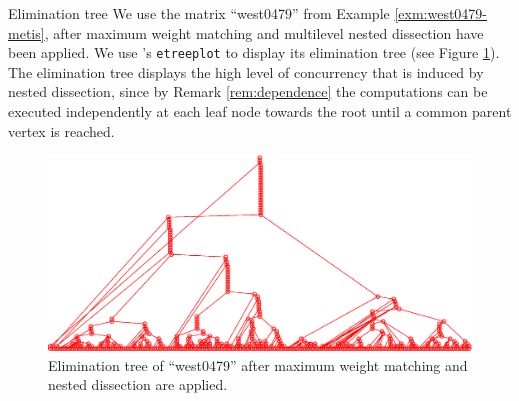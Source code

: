 %
%
%

\begin{example}{Elimination tree}\label{exm:etree}
We use the matrix ``west0479'' from Example \ref{exm:west0479-metis},
after maximum weight matching and multilevel nested dissection have
been applied. We use \ml's \texttt{etreeplot} to display its elimination
tree (see Figure \ref{fig:etreeplot}). The elimination tree displays the high
level of concurrency that is induced by nested dissection, since 
by Remark \ref{rem:dependence} the computations can be executed independently
at each leaf node towards the root until a common parent vertex is reached.
\end{example}
\begin{figure}
{
\begin{minipage}{.99\textwidth}
\includegraphics[width=\textwidth,height=0.3\textwidth]{figures/west0479-match-metis-etree}
\end{minipage}
}
\caption{Elimination tree of ``west0479'' after maximum weight matching and nested dissection are applied.}\label{fig:etreeplot}
\end{figure}





